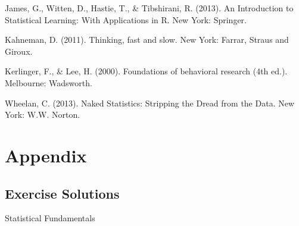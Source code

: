 \documentclass[]{book}
\begin{document}
James, G., Witten, D., Hastie, T., \& Tibshirani, R. (2013). An Introduction to Statistical Learning: With Applications in R. New York: Springer.

Kahneman, D. (2011). Thinking, fast and slow. New York: Farrar, Straus and Giroux.

Kerlinger, F., \& Lee, H. (2000). Foundations of behavioral research (4th ed.). Melbourne: Wadsworth.

Wheelan, C. (2013). Naked Statistics: Stripping the Dread from the Data. New York: W.W. Norton.

\hypertarget{appendix}{%
\chapter{Appendix}\label{appendix}}

\hypertarget{exercise-solutions}{%
\section{Exercise Solutions}\label{exercise-solutions}}

Statistical Fundamentals
\end{document}
